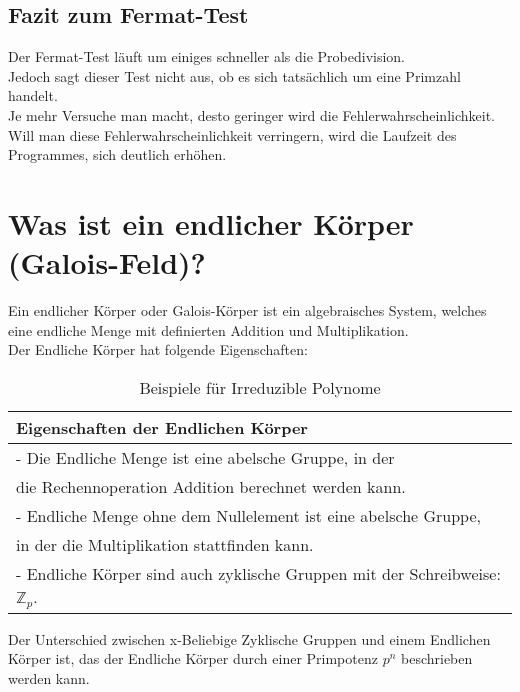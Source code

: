 \subsection*{Fazit zum Fermat-Test}

Der Fermat-Test läuft um einiges schneller als die Probedivision.\\
Jedoch sagt dieser Test nicht aus, ob es sich tatsächlich um eine Primzahl handelt.\\
Je mehr Versuche man macht, desto geringer wird die Fehlerwahrscheinlichkeit. \\
Will man diese Fehlerwahrscheinlichkeit verringern, wird die Laufzeit des Programmes, sich deutlich erhöhen.  \\

\section{Was ist ein endlicher Körper (Galois-Feld)?}

Ein endlicher Körper oder Galois-Körper ist ein algebraisches System, welches eine endliche Menge mit definierten Addition und Multiplikation.\\
Der Endliche Körper hat folgende Eigenschaften:


\begin{table}[!ht]
    \centering
        \begin{tabular}{l}
            \toprule
            \textbf{Eigenschaften der Endlichen Körper}\\
            \midrule
            - Die Endliche Menge ist eine abelsche Gruppe, in der \\
            die Rechennoperation Addition berechnet werden kann.\\
            - Endliche Menge ohne dem Nullelement ist eine abelsche Gruppe, \\
            in der die Multiplikation stattfinden kann.\\
            - Endliche Körper sind auch zyklische Gruppen mit der Schreibweise: $ \mathbb{Z}_p $. \\
           \bottomrule
        \end{tabular}
        \caption{Beispiele für Irreduzible Polynome}
        \label{tab3}
    \end{table}

Der Unterschied zwischen x-Beliebige Zyklische Gruppen und einem Endlichen Körper ist, das der Endliche Körper durch einer Primpotenz $ p^n $ beschrieben werden kann.

